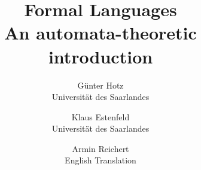 \documentclass{book}
\begin{document}
\title{
	Formal Languages\\
	An automata-theoretic introduction}

\author{
	G\"unter Hotz\\
	Universit\"at des Saarlandes
\and
	Klaus Estenfeld\\
	Universit\"at des Saarlandes
\and
	Armin Reichert\\
	English Translation
}

\maketitle


\tableofcontents


\end{document}
